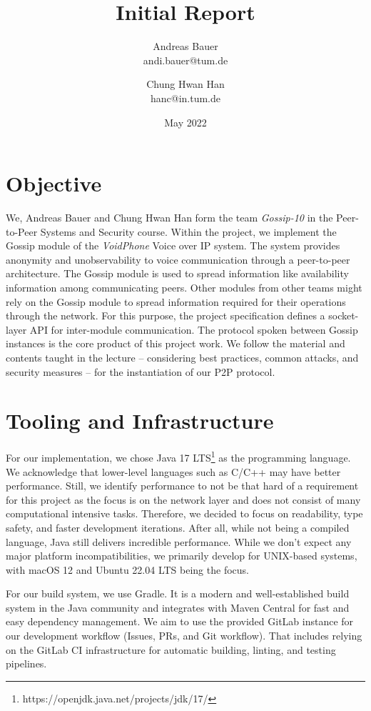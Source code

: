\documentclass[a4paper, 11pt]{article}
\title{Initial Report}
\author{
    Andreas Bauer\\
    andi.bauer@tum.de
  \and
    Chung Hwan Han\\
    hanc@in.tum.de
}
\date{May 2022}
\begin{document}
    \maketitle

    \section{Objective}\label{sec:objective}

    We, Andreas Bauer and Chung Hwan Han form the team \textit{Gossip-10} in the Peer-to-Peer Systems and Security course.
    Within the project, we implement the Gossip module of the \textit{VoidPhone} Voice over IP system.
    The system provides anonymity and unobservability to voice communication through a peer-to-peer architecture.
    The Gossip module is used to spread information like availability information among communicating peers.
    Other modules from other teams might rely on the Gossip module to spread information required for their operations
    through the network.
    For this purpose, the project specification defines a socket-layer API for inter-module communication.
    The protocol spoken between Gossip instances is the core product of this project work.
    We follow the material and contents taught in the lecture -- considering best practices, common attacks, and security measures --
    for the instantiation of our P2P protocol.

    \section{Tooling and Infrastructure}\label{sec:tooling-and-infrastructure}
    For our implementation, we chose Java 17 LTS\footnote{https://openjdk.java.net/projects/jdk/17/} as the programming language.
    We acknowledge that lower-level languages such as C/C++ may have better performance.
    Still, we identify performance to not be that hard of a requirement for this project
    as the focus is on the network layer and does not consist of many computational intensive tasks.
    Therefore, we decided to focus on readability, type safety, and faster development iterations.
    After all, while not being a compiled language, Java still delivers incredible performance.
    While we don't expect any major platform incompatibilities, we primarily develop for UNIX-based systems, with macOS 12 and Ubuntu 22.04 LTS being the focus.

    For our build system, we use Gradle.
    It is a modern and well-established build system in the Java community and integrates with Maven Central for fast and easy dependency management.
    We aim to use the provided GitLab instance for our development workflow (Issues, PRs, and Git workflow).
    That includes relying on the GitLab CI infrastructure for automatic building, linting, and testing pipelines.
\end{document}
